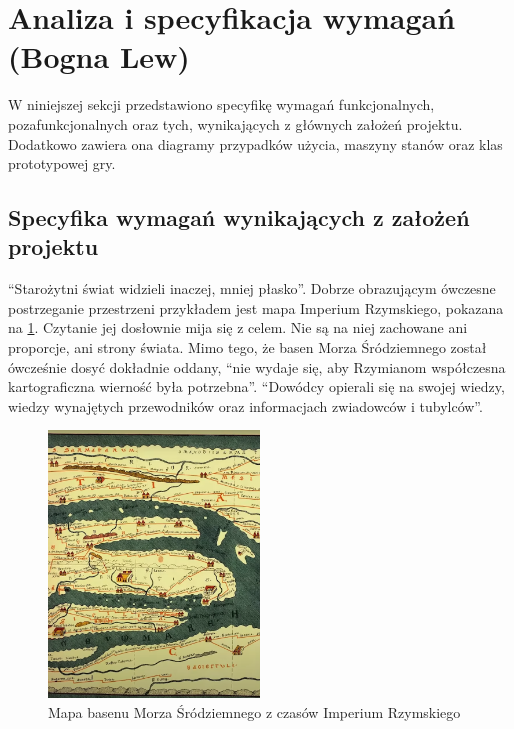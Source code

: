 \section{Analiza i specyfikacja wymagań (Bogna Lew)}\label{s:wymagania}
W niniejszej sekcji przedstawiono specyfikę wymagań funkcjonalnych, pozafunkcjonalnych oraz tych, wynikających z
głównych założeń projektu. Dodatkowo zawiera ona diagramy przypadków użycia, maszyny stanów oraz klas prototypowej gry.

\subsection{Specyfika wymagań wynikających z założeń projektu}
“Starożytni świat widzieli inaczej, mniej płasko”\cite{gbobrektvgry}. Dobrze obrazującym ówczesne postrzeganie
przestrzeni przykładem jest mapa Imperium Rzymskiego, pokazana na \ref{fig:mapaIR}. Czytanie jej dosłownie mija się z
celem. Nie są na niej zachowane ani proporcje, ani strony świata. Mimo tego, że basen Morza Śródziemnego został
ówcześnie dosyć dokładnie oddany, “nie wydaje się, aby Rzymianom współczesna kartograficzna wierność była potrzebna”\cite{gbobrektvgry}.
“Dowódcy opierali się na swojej wiedzy, wiedzy wynajętych przewodników oraz informacjach zwiadowców i tubylców”\cite{gbobrektvgry}.

\begin{figure}[htbp]
    \centering
    \includegraphics[width=0.5\textwidth]{images/mapaIR.png}
    \caption{Mapa basenu Morza Śródziemnego z czasów Imperium Rzymskiego}\label{fig:mapaIR}
\end{figure}

